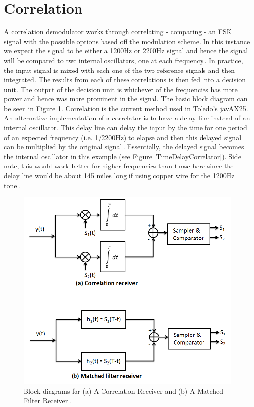 \section{Correlation}
A correlation demodulator works through correlating - comparing - an FSK signal with the possible options based off the modulation scheme. In this instance we expect the signal to be either a 1200Hz or 2200Hz signal and hence the signal will be compared to two internal oscillators, one at each frequency\,\cite{Rowe2014}. In practice, the input signal is mixed with each one of the two reference signals and then integrated. The results from each of these correlations is then fed into a decision unit. The output of the decision unit is whichever of the frequencies has more power and hence was more prominent in the signal. The basic block diagram can be seen in Figure \ref{BlockDiagrams}. Correlation is the current method used in Toledo's javAX25. An alternative implementation of a correlator is to have a delay line instead of an internal oscillator. This delay line can delay the input by the time for one period of an expected frequency (i.e. 1/2200Hz) to elapse and then this delayed signal can be multiplied by the original signal\,\cite{Seguine2006}. Essentially, the delayed signal becomes the internal oscillator in this example (see Figure \ref{TimeDelayCorrelator}). Side note, this would work better for higher frequencies than those here since the delay line would be about 145 miles long if using copper wire for the 1200Hz tone\,\cite{HowFastIsElectricity}.

\begin{figure}
  \centering
	\includegraphics[width=0.75\linewidth]{images/MyBlockDiagrams.png} 
	\caption{Block diagrams for (a) A Correlation Receiver and (b) A Matched Filter Receiver\,\cite{J.Das1986}.}
   \label{BlockDiagrams}
\end{figure}

